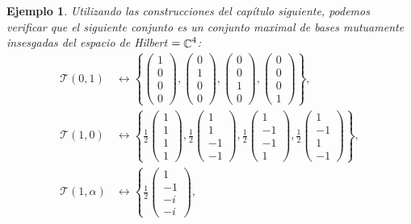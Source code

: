 \documentclass[a4paper]{report}
\DeclareMathOperator{\C}{\mathbb{C}}
\let\H\relax
\DeclareMathOperator{\H}{\mathcal H}
\newtheorem{example}{Ejemplo}
\begin{document}
\begin{example}
    Utilizando las construcciones del capítulo siguiente,
    podemos verificar que el siguiente conjunto es un
    conjunto maximal de bases mutuamente insesgadas del
    espacio de Hilbert $\H = \C^{4}$:
    \begin{align}
      \mathcal T(0,1) &\leftrightarrow \left\{
      \begin{pmatrix} 1\\0\\0\\0 \end{pmatrix},
      \begin{pmatrix} 0\\1\\0\\0 \end{pmatrix},
      \begin{pmatrix} 0\\0\\1\\0 \end{pmatrix},
      \begin{pmatrix} 0\\0\\0\\1 \end{pmatrix}
      \right\}, \\
      \mathcal T(1,0) &\leftrightarrow \left\{
      \frac{1}{2} \begin{pmatrix} 1\\1\\1\\1 \end{pmatrix}, 
      \frac{1}{2} \begin{pmatrix} 1\\1\\-1\\-1 \end{pmatrix}, 
      \frac{1}{2} \begin{pmatrix} 1\\-1\\-1\\1 \end{pmatrix},
      \frac{1}{2} \begin{pmatrix} 1\\-1\\1\\-1 \end{pmatrix} 
      \right\}, \\
      \mathcal T(1,\alpha) &\leftrightarrow \left\{
      \frac{1}{2} \begin{pmatrix} 1\\-1\\-i\\-i \end{pmatrix}, 

\end{align}
\end{example}
\end{document}
